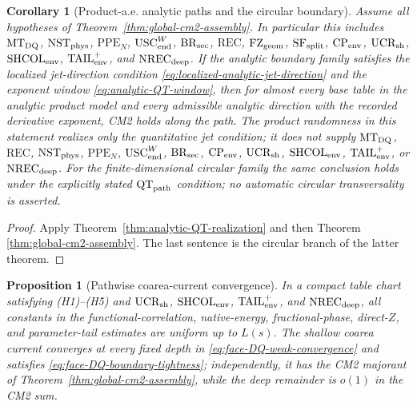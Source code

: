 \documentclass[11pt]{article}
\newtheorem{proposition}[theorem]{Proposition}
\newtheorem{corollary}[theorem]{Corollary}
\begin{document}
\begin{corollary}[Product-a.e. analytic paths and the circular boundary]
\label{cor:analytic-pathwise-CM2}
Assume all hypotheses of Theorem~\ref{thm:global-cm2-assembly}.  In
particular this includes $\mathrm{MT}_{\rm DQ}$,
$\mathrm{NST}_{\rm phys}$, $\mathrm{PPE}_{N}$,
$\mathrm{USC}_{\rm end}^{W}$,
$\mathrm{BR}_{\rm sec}$,
$\mathrm{REC}$, $\mathrm{FZ}_{\rm geom}$, $\mathrm{SF}_{\rm split}$,
$\mathrm{CP}_{\rm env}$, $\mathrm{UCR}_{\rm sh}$,
$\mathrm{SHCOL}_{\rm env}$, $\mathrm{TAIL}_{\rm env}^{+}$, and
$\mathrm{NREC}_{\rm deep}$.  If the analytic boundary family
satisfies the localized jet-direction condition
\eqref{eq:localized-analytic-jet-direction} and the exponent window
\eqref{eq:analytic-QT-window}, then for almost every base table in the
analytic product model and every admissible analytic direction with the
recorded derivative exponent, CM2 holds along the path.
The product randomness in this statement realizes only the quantitative jet
condition; it does not supply $\mathrm{MT}_{\rm DQ}$,
$\mathrm{REC}$,
$\mathrm{NST}_{\rm phys}$, $\mathrm{PPE}_{N}$,
$\mathrm{USC}_{\rm end}^{W}$,
$\mathrm{BR}_{\rm sec}$,
$\mathrm{CP}_{\rm env}$, $\mathrm{UCR}_{\rm sh}$,
$\mathrm{SHCOL}_{\rm env}$, $\mathrm{TAIL}_{\rm env}^{+}$, or
$\mathrm{NREC}_{\rm deep}$.
For the finite-dimensional circular family the same conclusion holds under
the explicitly stated $\mathrm{QT}_{\rm path}$ condition; no automatic
circular transversality is asserted.
\end{corollary}

\begin{proof}
Apply Theorem~\ref{thm:analytic-QT-realization} and then Theorem
\ref{thm:global-cm2-assembly}.  The last sentence is the circular branch of
the latter theorem.
\end{proof}

\begin{proposition}[Pathwise coarea-current convergence]
\label{prop:common-refinement-majorant}
In a compact table chart satisfying \textup{(H1)--(H5)} and
$\mathrm{UCR}_{\rm sh}$, $\mathrm{SHCOL}_{\rm env}$,
$\mathrm{TAIL}_{\rm env}^{+}$, and
$\mathrm{NREC}_{\rm deep}$, all constants in the
functional-correlation, native-energy, fractional-phase, direct-$Z$, and
parameter-tail estimates are uniform up to $L(s)$.  The shallow coarea current
converges at every fixed depth in
\eqref{eq:face-DQ-weak-convergence} and satisfies
\eqref{eq:face-DQ-boundary-tightness}; independently, it has the CM2
majorant of Theorem~\ref{thm:global-cm2-assembly}, while the deep
remainder is $o(1)$ in the CM2 sum.
\end{proposition}
\end{document}
